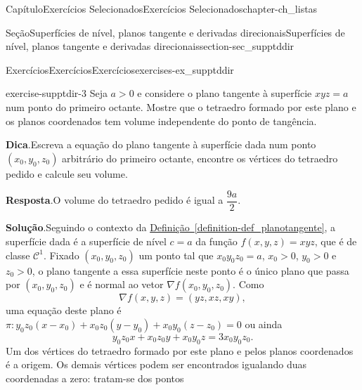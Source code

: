 \documentclass[oneside,10pt,]{book}
\newcommand{\blocktitlefont}{\relax}
\newcommand{\xreffont}{\relax}
\numberwithin{equation}{section}
\begin{document}
\begin{chapterptx}{Capítulo}{Exercícios Selecionados}{}{Exercícios Selecionados}{}{}{chapter-ch_listas}
%
%
\typeout{************************************************}
\typeout{************************************************}
%
\begin{sectionptx}{Seção}{Superfícies de nível, planos tangente e derivadas direcionais}{}{Superfícies de nível, planos tangente e derivadas direcionais}{}{}{section-sec_supptddir}
%
%
\typeout{************************************************}
\typeout{************************************************}
%
\begin{exercises-subsection-numberless}{Exercícios}{Exercícios}{}{Exercícios}{}{}{exercises-ex_supptddir}
\begin{divisionexercise}{3}{}{}{exercise-supptdir-3}%
Seja \(a>0\) e considere o plano tangente à superfície \(xyz=a\) num ponto do primeiro octante. Mostre que o tetraedro formado por este plano e os planos coordenados tem volume independente do ponto de tangência.%
\par\smallskip%
\noindent\textbf{\blocktitlefont Dica}.\hypertarget{hint-supptdir-3-b}{}\quad{}Escreva a equação do plano tangente à superfície dada num ponto \((x_0,y_0,z_0)\) arbitrário do primeiro octante, encontre os vértices do tetraedro pedido e calcule seu volume.%
\par\smallskip%
\noindent\textbf{\blocktitlefont Resposta}.\hypertarget{answer-supptdir-3-c}{}\quad{}O volume do tetraedro pedido é igual a \(\dfrac{9a}{2}\).%
\par\smallskip%
\noindent\textbf{\blocktitlefont Solução}.\hypertarget{solution-supptdir-3-d}{}\quad{}Seguindo o contexto da \hyperref[definition-def_planotangente]{Definição~{\xreffont\ref{definition-def_planotangente}}}, a superfície dada é a superfície de nível \(c=a\) da função \(f(x,y,z) = xyz\), que é de classe \(\mathscr{C}^1\). Fixado \((x_0,y_0,z_0)\) um ponto tal que \(x_0y_0z_0 = a\), \(x_0> 0\), \(y_0> 0\) e \(z_0> 0\), o plano tangente a essa superfície neste ponto é o único plano que passa por \((x_0,y_0,z_0)\) e é normal ao vetor \(\nabla f(x_0,y_0,z_0)\). Como%
\begin{equation*}
\nabla f(x,y,z) =
(yz, xz, xy),
\end{equation*}
uma equação deste plano é \(\pi\colon
y_0z_0(x-x_0) + x_0z_0(y-y_0) + x_0y_0(z-z_0)=0\) ou ainda%
\begin{equation*}
y_0z_0 x + x_0z_0 y + x_0y_0 z = 3x_0y_0z_0.
\end{equation*}
Um dos vértices do tetraedro formado por este plano e pelos planos coordenados é a origem. Os demais vértices podem ser encontrados igualando duas coordenadas a zero: tratam-se dos pontos%

\end{divisionexercise}
\end{exercises-subsection-numberless}
\end{sectionptx}
\end{chapterptx}
\end{document}

